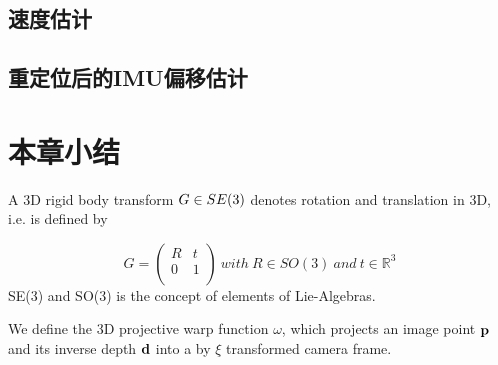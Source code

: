 \subsection{速度估计}




\subsection{重定位后的IMU偏移估计}





\section{本章小结}




\iffalse
A 3D rigid body transform $G{\rm{ }} \in {\rm{ }}SE(3)$  denotes rotation and translation in 3D,  i.e. is defined by

\begin{equation}
G=\left(
    \begin{array}{cc}
      R & t \\
      0 & 1 \\
    \end{array}
  \right)
    \ with
    \ R\in SO(3)
    \ and
    \ t\in {\mathbb{R}}^{3}
\end{equation}
SE(3) and SO(3) is the concept of elements of Lie-Algebras.

We define the 3D projective warp function $\omega $, which projects an image point ${\bf{p}}$ and its inverse depth ${\bf{d}}$ into a by $\xi $ transformed camera frame.

